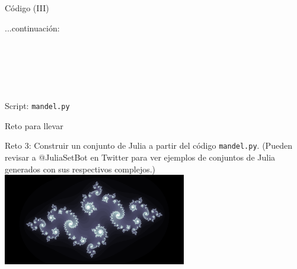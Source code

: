 \documentclass[usenames,dvipsnames]{beamer}
\begin{document}
  \begin{frame}{Código (III)}
    \begin{block}{...continuación:}
      \vspace*{0.5cm}
      \\
      \\
      \\
      \\
      \\
      \vspace*{0.5cm}
      \\
      \vspace*{0.5cm}
    \end{block}
    Script: \texttt{mandel.py}
  \end{frame}

  \begin{frame}{Reto para llevar}
    \vspace*{0.5cm}
    \begin{block}{Reto 3:}
      Construir un conjunto de Julia a partir del código \texttt{mandel.py}.
      (Pueden revisar a {\color{Turquoise} @JuliaSetBot} en Twitter para
      ver ejemplos de conjuntos de Julia generados con sus respectivos
      complejos.)\\
      \vspace*{0.5cm}
      \centering
      \includegraphics[width=0.6\textwidth]{imgs/julia}\\
      \vspace*{0.5cm}
    \end{block}
  \end{frame}
\end{document}
